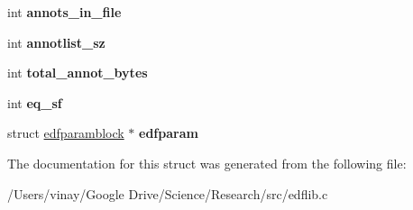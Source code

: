 \begin{DoxyCompactItemize}
\item 
\hypertarget{structedfhdrblock_a106cf4e23522978df18cb08ffdcf6f24}{}int {\bfseries annots\+\_\+in\+\_\+file}\label{structedfhdrblock_a106cf4e23522978df18cb08ffdcf6f24}

\item 
\hypertarget{structedfhdrblock_a052f1a23fb52e228540b1f07e9a0d686}{}int {\bfseries annotlist\+\_\+sz}\label{structedfhdrblock_a052f1a23fb52e228540b1f07e9a0d686}

\item 
\hypertarget{structedfhdrblock_a30c1d84fb48890ed540c3924501643bd}{}int {\bfseries total\+\_\+annot\+\_\+bytes}\label{structedfhdrblock_a30c1d84fb48890ed540c3924501643bd}

\item 
\hypertarget{structedfhdrblock_acdc9fb5d22ae3ba12fbecd860910aeab}{}int {\bfseries eq\+\_\+sf}\label{structedfhdrblock_acdc9fb5d22ae3ba12fbecd860910aeab}

\item 
\hypertarget{structedfhdrblock_a5c6416b3dde530ce6b6b2dc18512dd02}{}struct \hyperlink{structedfparamblock}{edfparamblock} $\ast$ {\bfseries edfparam}\label{structedfhdrblock_a5c6416b3dde530ce6b6b2dc18512dd02}

\end{DoxyCompactItemize}


The documentation for this struct was generated from the following file\+:\begin{DoxyCompactItemize}
\item 
/\+Users/vinay/\+Google Drive/\+Science/\+Research/src/edflib.\+c\end{DoxyCompactItemize}
